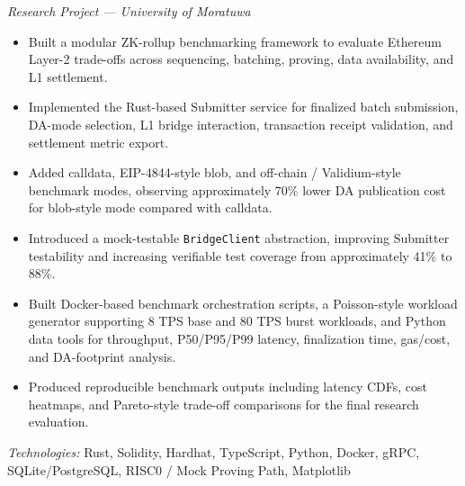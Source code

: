 \noindent
{}

\noindent
\textit{Research Project — University of Moratuwa}

\begin{itemize}
    \item Built a modular ZK-rollup benchmarking framework to evaluate Ethereum Layer-2 trade-offs across sequencing, batching, proving, data availability, and L1 settlement.

    \item Implemented the Rust-based Submitter service for finalized batch submission, DA-mode selection, L1 bridge interaction, transaction receipt validation, and settlement metric export.

    \item Added calldata, EIP-4844-style blob, and off-chain / Validium-style benchmark modes, observing approximately 70\% lower DA publication cost for blob-style mode compared with calldata.

    \item Introduced a mock-testable \texttt{BridgeClient} abstraction, improving Submitter testability and increasing verifiable test coverage from approximately 41\% to 88\%.

    \item Built Docker-based benchmark orchestration scripts, a Poisson-style workload generator supporting 8 TPS base and 80 TPS burst workloads, and Python data tools for throughput, P50/P95/P99 latency, finalization time, gas/cost, and DA-footprint analysis.

    \item Produced reproducible benchmark outputs including latency CDFs, cost heatmaps, and Pareto-style trade-off comparisons for the final research evaluation.
\end{itemize}

\noindent
\textit{Technologies:} Rust, Solidity, Hardhat, TypeScript, Python, Docker, gRPC, SQLite/PostgreSQL, RISC0 / Mock Proving Path, Matplotlib
